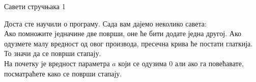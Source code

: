 ﻿\documentclass[en]{./../../common/SurferDesc}%
\begin{document}
\footnotesize
%

\begin{surferPage}
  \begin{surferTitle}Савети стручњака 1\end{surferTitle}
   \begin{surferText}

Доста сте научили о програму. Сада вам дајемо неколико савета:\\
\vspace{0.3cm}
Ако помножите једначине две површи, оне ће бити додате једна другој. Ако одузмете малу вредност од овог производа, пресечна крива ће постати глаткија. То значи да се површи стапају.\\
\vspace{0.3cm}
На почетку је вредност параметра $a$ који се одузима 0 али ако га повећавате, посматраћете како се површи стапају.

   \end{surferText}
\end{surferPage}

 
\end{document}
